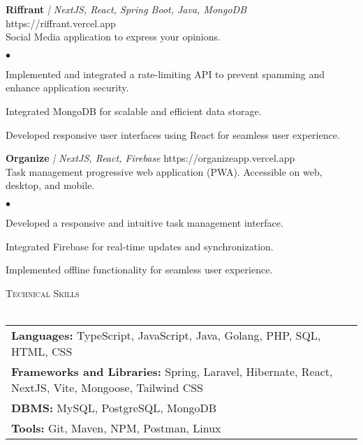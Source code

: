 \documentclass[a4paper]{article}
\newcommand{\lineunder} {
        \vspace*{-8pt} \\
        \hspace*{-18pt} \hrulefill \\
    }
\newcommand{\header} [1] {
        {\vspace*{4mm} \hspace*{-18pt}\vspace*{8pt} \textsc{#1}}
        \vspace*{-6pt} \lineunder
    }
\newenvironment{achievements}{
        \begin{list}
            {$\bullet$}{\topsep 0pt \itemsep -2pt}}{\vspace*{4pt}
        \end{list}
    }
\begin{document}
    {\textbf{Riffrant}} {\sl | NextJS, React, Spring Boot, Java, MongoDB} \hfill https://riffrant.vercel.app\\
    \vspace{1mm}
    Social Media application to express your opinions.\\
    \begin{achievements}
       \item Implemented and integrated a rate-limiting API to prevent spamming and enhance application security.
        \item Integrated MongoDB for scalable and efficient data storage.
        \item Developed responsive user interfaces using React for seamless user experience.
    \end{achievements}
    \vspace*{3mm}

    {\textbf{Organize}} {\sl | NextJS, React, Firebase} \hfill https://organizeapp.vercel.app\\
    \vspace{1mm}
    Task management progressive web application (PWA). Accessible on web, desktop, and mobile.\\
    \begin{achievements}
        \item Developed a responsive and intuitive task management interface.
        \item Integrated Firebase for real-time updates and synchronization.
        \item Implemented offline functionality for seamless user experience.
    \end{achievements}

    \renewcommand{\arraystretch}{1.5}
    \header{Technical Skills}
    \begin{tabular}{ l l }
        \textbf{Languages:} TypeScript, JavaScript, Java, Golang, PHP, SQL, HTML, CSS                   \\
        \textbf{Frameworks and Libraries:} Spring, Laravel, Hibernate, React, NextJS, Vite, Mongoose, Tailwind CSS \\
        \textbf{DBMS:} MySQL, PostgreSQL, MongoDB                                              \\
        \textbf{Tools:} Git, Maven, NPM, Postman, Linux                                       \\
    \end{tabular}
    \vspace{2mm}
\end{document}
